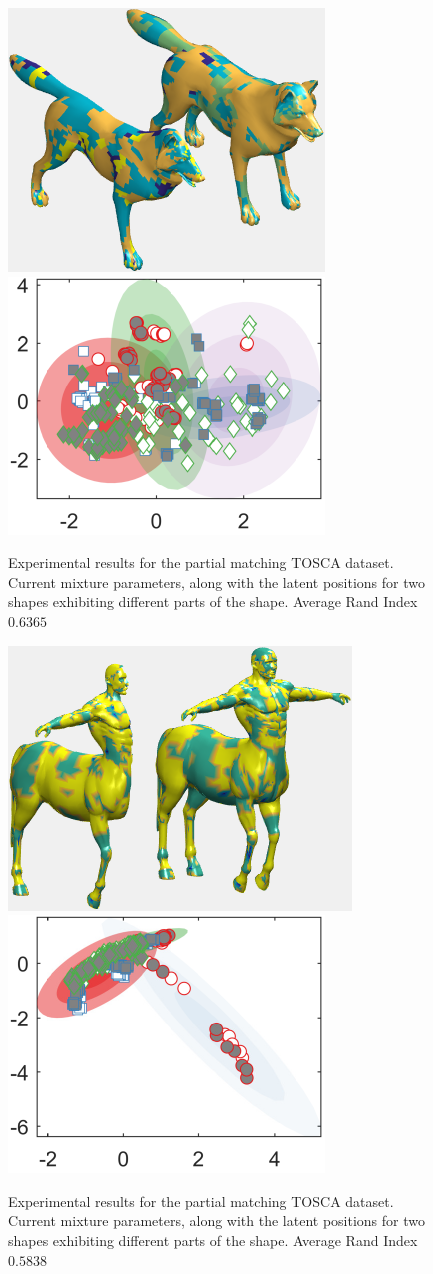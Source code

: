 \documentclass[]{article}
\begin{document}
\begin{figure}[ht!]
	\centering
	
	\includegraphics[width=0.4\linewidth]{img/partialWolf1MVMMexp1}
	\includegraphics[width=0.35\linewidth]{img/partialWolf1MVMMexp3}
	\caption{Experimental results for the partial matching TOSCA dataset. Current mixture parameters, along with the latent positions for two shapes exhibiting different parts of the shape. Average Rand Index $0.6365$ }
\end{figure}


\begin{figure}[ht!]
	\centering
	
	\includegraphics[width=0.4\linewidth]{img/partialCentaur1MVMMexp1}
	\includegraphics[width=0.35\linewidth]{img/partialCentaur1MVMMexp3}
	\caption{Experimental results for the partial matching TOSCA dataset. Current mixture parameters, along with the latent positions for two shapes exhibiting different parts of the shape. Average Rand Index $0.5838$ }
\end{figure}
\end{document}
